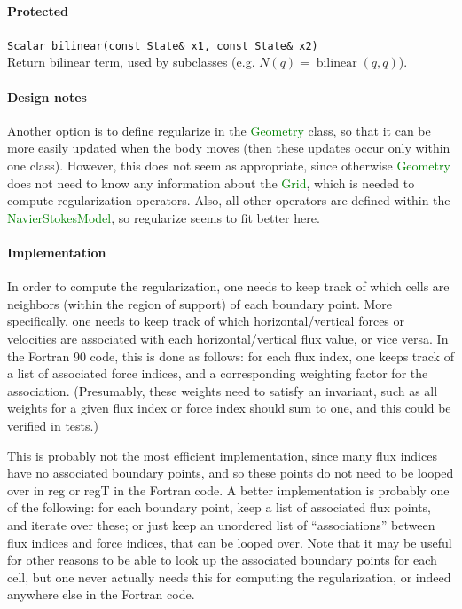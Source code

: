 \documentclass[11pt]{article}
\def\class#1{\textcolor{green}{\ttfamily\small #1}} %
\def\fn#1{{\ttfamily\small #1}} %
\let\code\lstinline
\begin{document}
\paragraph{Protected}
\begin{description}
	\item \code|Scalar bilinear(const State& x1, const State& x2)|\\
		Return bilinear term, used by subclasses (e.g. $N(q)=\operatorname{bilinear}(q,q)$).
\end{description}

\paragraph{Design notes}
Another option is to define \fn{regularize} in the \class{Geometry} class, so that it can be more easily updated when the body moves (then these updates occur only within one class).  However, this does not seem as appropriate, since otherwise \class{Geometry} does not need to know any information about the \class{Grid}, which is needed to compute regularization operators.  Also, all other operators are defined within the \class{NavierStokesModel}, so \fn{regularize} seems to fit better here.

\paragraph{Implementation}
In order to compute the regularization, one needs to keep track of which cells are neighbors (within the region of support) of each boundary point.  More specifically, one needs to keep track of which horizontal/vertical forces or velocities are associated with each horizontal/vertical flux value, or vice versa.  In the Fortran 90 code, this is done as follows: for each flux index, one keeps track of a list of associated force indices, and a corresponding weighting factor for the association.  (Presumably, these weights need to satisfy an invariant, such as all weights for a given flux index or force index should sum to one, and this could be verified in tests.)

This is probably not the most efficient implementation, since many flux indices have no associated boundary points, and so these points do not need to be looped over in \fn{reg} or \fn{regT} in the Fortran code.  A better implementation is probably one of the following: for each boundary point, keep a list of associated flux points, and iterate over these; or just keep an unordered list of ``associations'' between flux indices and force indices, that can be looped over.  Note that it may be useful for other reasons to be able to look up the associated boundary points for each cell, but one never actually needs this for computing the regularization, or indeed anywhere else in the Fortran code.
\end{document}
